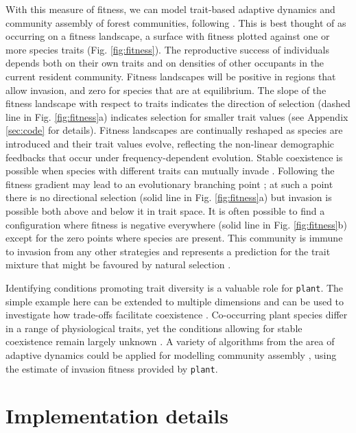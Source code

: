 \documentclass[a4paper,11pt]{article}
\newcommand{\plant}{\texttt{plant}}
\begin{document}
With this measure of fitness, we can model trait-based adaptive
dynamics and community assembly of forest communities, following
 \citep{Falster-2015}. This is best thought of as occurring on a fitness landscape, a surface with fitness plotted against one or more species traits
(Fig. \ref{fig:fitness}). The reproductive success of individuals
depends both on their own traits and on densities of other occupants in the current resident community. Fitness landscapes will be positive in regions that allow invasion, and zero
for species that are at equilibrium. The slope of the fitness
landscape with respect to traits indicates the direction of selection
(dashed line in Fig. \ref{fig:fitness}a) indicates selection for
smaller trait values (see Appendix \ref{sec:code} for
details). Fitness landscapes are continually reshaped as species are
introduced and their trait values evolve, reflecting the non-linear demographic feedbacks
that occur under frequency-dependent evolution. Stable coexistence is
possible when species with different traits can mutually invade
\citep{Geritz-1998, Chesson-2000}. Following the fitness gradient may lead to an
evolutionary branching point \citep{Geritz-1998}; at
such a point there is no directional selection (solid line in
Fig. \ref{fig:fitness}a) but invasion is possible both above and below
it in trait space. It is often possible to find a configuration where
fitness is negative everywhere (solid line in Fig. \ref{fig:fitness}b)
except for the zero points where species are present. This community
is immune to invasion from any other strategies and represents a
prediction for the trait mixture that might be favoured by
natural selection \citep{Geritz-1998}.

Identifying conditions promoting trait diversity is a valuable role
for {\plant}. The simple example here can be extended to multiple dimensions
and can be used to investigate how trade-offs facilitate coexistence
\citep{Falster-2015}. Co-occurring plant species differ in a range of physiological
traits, yet the conditions allowing for stable coexistence remain largely
unknown \citep{Adler-2013}.
A variety of algorithms from the area of adaptive dynamics could be
applied for modelling community assembly \citep[e.g.][Fig. \ref{fig:schematic}]{Geritz-1998, Falster-2015}, using the estimate of invasion fitness provided by {\plant}.

\section{Implementation details}
\end{document}
